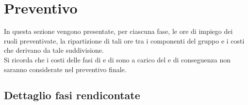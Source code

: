 \section{Preventivo}\label{sdl}
In questa sezione vengono presentate, per ciascuna fase, le ore di impiego dei ruoli preventivate, la ripartizione di tali ore tra i componenti del gruppo e i costi che derivano da tale suddivisione. \\
Si ricorda che i costi delle fasi di \fA e di \fAD sono a carico del  e di conseguenza non saranno considerate nel preventivo finale.
\subsection{Dettaglio fasi rendicontate}
